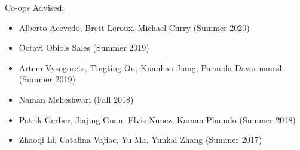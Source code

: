 \vspace{-0.3in}

Co-ops Advised:
\begin{itemize}
 \itemsep 0pt
        \item Alberto Acevedo, Brett Leroux, Michael Curry (Summer 2020)
        \item Octavi Obiols Sales (Summer 2019)
	\item Artem Vysogorets, Tingting Ou, Kuanhao Jiang, Parmida Davarmanesh (Summer 2019) 
        \item Naman Meheshwari (Fall 2018)
	\item Patrik Gerber, Jiajing Guan, Elvis Nunez, Kaman Phamdo (Summer 2018)
	\item Zhaoqi Li, Catalina Vajiac, Yu Ma, Yunkai Zhang (Summer 2017)
\end{itemize}


